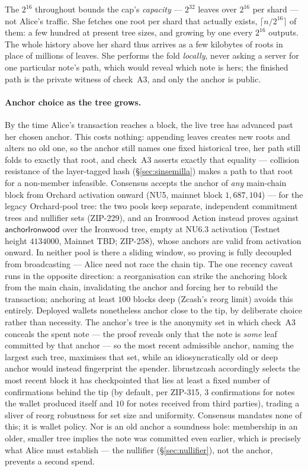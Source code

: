 \documentclass[11pt,a4paper]{article}
\theoremstyle{definition}
\begin{document}
The $2^{16}$ throughout bounds the cap's \emph{capacity} --- $2^{32}$ leaves over
$2^{16}$ per shard --- not Alice's traffic. She fetches one root per shard that
actually exists, $\lceil n/2^{16} \rceil$ of them: a few hundred at present tree
sizes, and growing by one every $2^{16}$ outputs. The whole history above her
shard thus arrives as a few kilobytes of roots in place of millions of leaves.
She performs the fold \emph{locally}, never asking a server for one particular
note's path, which would reveal which note is hers; the finished path is the
private witness of check~A3, and only the anchor is public.

\paragraph{Anchor choice as the tree grows.}
By the time Alice's transaction reaches a block, the live tree has advanced
past her chosen anchor. This costs nothing: appending leaves creates new
roots and alters no old one, so the anchor still names one fixed historical
tree, her path still folds to exactly that root, and check~A3 asserts exactly
that equality --- collision resistance of the layer-tagged hash
(\S\ref{sec:sinsemilla}) makes a path to that root for a non-member
infeasible. Consensus accepts the anchor of \emph{any} main-chain block from
Orchard activation onward (NU5, mainnet block $1{,}687{,}104$) --- for the
legacy Orchard-pool tree: the two pools keep separate, independent
commitment trees and nullifier sets (ZIP-229), and an Ironwood Action
instead proves against $\mathsf{anchorIronwood}$ over the Ironwood tree,
empty at NU6.3 activation (Testnet height $4134000$, Mainnet TBD; ZIP-258),
whose anchors are valid from activation onward. In neither pool is there a
sliding window, so proving is fully decoupled from broadcasting --- Alice
need not race the chain tip. The one recency caveat runs in the opposite
direction: a reorganisation can strike the anchoring block from the main
chain, invalidating the anchor and forcing her to rebuild the transaction;
anchoring at least $100$ blocks deep (Zcash's reorg limit) avoids this
entirely. Deployed wallets nonetheless anchor close to the tip, by
deliberate choice rather than necessity. The anchor's tree is the anonymity
set in which check~A3 conceals the spent note --- the proof reveals only that
the note is \emph{some} leaf committed by that anchor --- so the most recent
admissible anchor, naming the largest such tree, maximises that set, while an
idiosyncratically old or deep anchor would instead fingerprint the spender.
\textsf{librustzcash} accordingly selects the most recent block it has
checkpointed that lies at least a fixed number of confirmations behind the tip
(by default, per ZIP-315, $3$ confirmations for notes the wallet produced
itself and $10$ for notes received from third parties), trading a sliver of
reorg robustness for set size and uniformity. Consensus mandates none of this;
it is wallet policy. Nor is an old anchor a soundness hole: membership in an older,
smaller tree implies the note was committed even earlier, which is precisely
what Alice must establish --- the nullifier (\S\ref{sec:nullifier}), not the
anchor, prevents a second spend.
\end{document}
